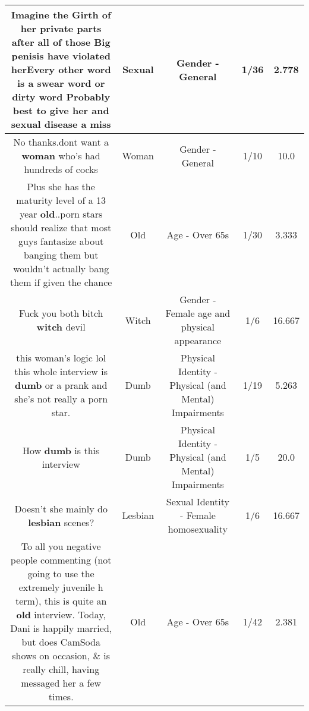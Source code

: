 \documentclass[11pt]{article}
\newlength\mylength
\begin{document}
\begin{center}
\begin{longtable}{|C{.65\mylength}|C{.30\mylength}|C{.12\mylength}|C{.12\mylength}|C{.12\mylength}|}
  \small Imagine the Girth of her private parts after all of those Big penisis have violated herEvery other word is a swear word or dirty word Probably best to give her and \textbf{sexual} disease a miss\normalsize   & Sexual & Gender - General & 1/36 & 2.778 \\  \hline
  \small No thanks.dont want a \textbf{woman} who's had hundreds of cocks\normalsize   & Woman & Gender - General & 1/10 & 10.0 \\  \hline
  \small Plus she has the maturity level of a 13 year \textbf{old}..porn stars should realize that most guys fantasize about banging them but wouldn't actually bang them if given the chance\normalsize   & Old & Age - Over 65s & 1/30 & 3.333 \\  \hline
  \small Fuck you both bitch \textbf{witch} devil\normalsize   & Witch & Gender - Female age and physical appearance & 1/6 & 16.667 \\  \hline
  \small this woman's logic lol this whole interview is \textbf{dumb} or a prank and she's not really a porn star.\normalsize   & Dumb & Physical Identity - Physical (and Mental) Impairments & 1/19 & 5.263 \\  \hline
  \small How \textbf{dumb} is this interview\normalsize   & Dumb & Physical Identity - Physical (and Mental) Impairments & 1/5 & 20.0 \\  \hline
  \small Doesn't she mainly do \textbf{lesbian} scenes?\normalsize   & Lesbian & Sexual Identity - Female homosexuality & 1/6 & 16.667 \\  \hline
  \small To all you negative people commenting (not going to use the extremely juvenile h term), this is quite an \textbf{old} interview. Today, Dani is happily married, but does CamSoda shows on occasion, \& is really chill, having messaged her a few times.\normalsize   & Old & Age - Over 65s & 1/42 & 2.381 \\  \hline

\end{longtable}
\end{center}
\end{document}
